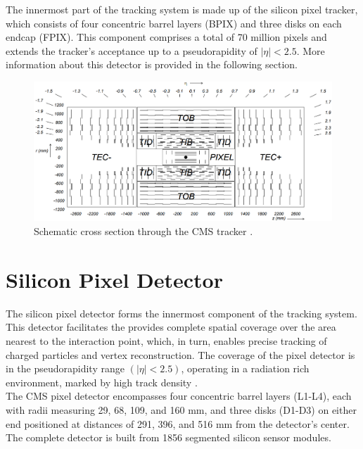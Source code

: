 The innermost part of the tracking system is made up of the silicon pixel tracker, which consists of four concentric barrel layers (BPIX) and three disks on each endcap (FPIX). This component comprises a total of 70 million pixels and extends the tracker's acceptance up to a pseudorapidity of $|\eta| < 2.5$. More information about this detector is provided in the following section.

\begin{center}
  \begin{figure}[ht]
    \centering
    \includegraphics[scale=.23]{Chapter2/strip_layout.png}
    \caption[Schematic cross section through the CMS tracker]{Schematic cross section through the CMS tracker \cite{CMS_Exp_2008}.}
    \label{strip_layout}
  \end{figure}
\end{center}


\section{Silicon Pixel Detector}

The silicon pixel detector  forms the innermost component of the tracking system. This detector facilitates the provides complete spatial coverage over the area nearest to the interaction point, which, in turn, enables precise tracking of charged particles and vertex reconstruction. The coverage of the pixel detector is in the pseudorapidity range $(|\eta| < 2.5)$, operating in a radiation rich environment, marked by high track density \cite{phase1_Pixel_Detector}.\\

The CMS pixel detector encompasses four concentric barrel layers (L1-L4), each with radii measuring 29, 68, 109, and 160 mm, and three disks (D1-D3) on either end positioned at distances of 291, 396, and 516 mm from the detector's center. The complete detector is built from 1856 segmented silicon sensor modules.\\  

